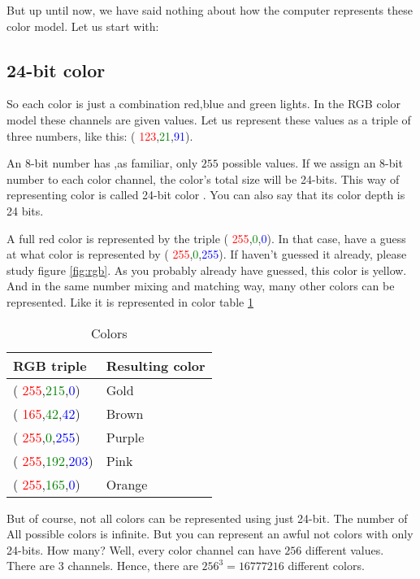 \begin{refsection}
  \newcommand{\rgbtrip}[3]{( \textcolor{red}{#1},\textcolor{green}{#2},\textcolor{blue}{#3})}

  But up until now, we have said nothing about how the computer
  represents these color model. Let us start with:

  \subsection{24-bit color}
  \label{sec:24-bit-color}

  So each color is just a combination red,blue and green lights. In the
  RGB color model these channels are given values. Let us represent
  these values as a triple of three numbers, like this:
  \rgbtrip{123}{21}{91}.

  An 8-bit number has ,as familiar, only $255$ possible values. If we
  assign an  8-bit number to each color channel, the color's total size
  will be 24-bits. This way of representing color is called 24-bit color
  . You can also say that its color depth  is 24 bits.

  A full red color is represented by the triple \rgbtrip{255}{0}{0}. In
  that case, have a guess at what color is represented by
  \rgbtrip{255}{0}{255}. If haven't guessed it already, please study
  figure \ref{fig:rgb}. As you probably already have guessed, this color
  is yellow. And in the same number mixing and matching way, many other
  colors can be represented. Like it is represented in color table
  \ref{tab:color-examples}

  \newcommand{\colorrow}[4]{  \rgbtrip{#1}{#2}{#3} &
    \textcolor[RGB]{#1,#2,#3}{#4} \\ \hline}

  \begin{table}[h!]
    \centering
    \begin{tabular}[h!]{|l|l|}
      \hline
      RGB triple & Resulting color \\ \hline
      \colorrow{255}{215}{0}{Gold}
      \colorrow{165}{42}{42}{Brown}
      \colorrow{255}{0}{255}{Purple}
      \colorrow{255}{192}{203}{Pink}
      \colorrow{255}{165}{0}{Orange}
    \end{tabular}
    \caption{Colors}
    \label{tab:color-examples}
  \end{table}

  But of course, not all colors can be represented using just
  24-bit. The number of All possible colors is infinite. But you can
  represent an awful not colors with only 24-bits. How many? Well, every
  color channel can have $256$ different values. There are $3$
  channels. Hence, there are $256^3 = 16777216$ different colors.


\end{refsection}
